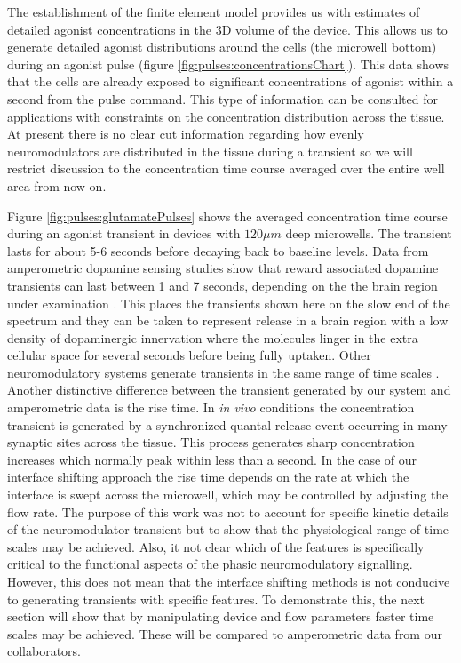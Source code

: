   The establishment of the finite element model provides us with estimates of detailed agonist concentrations in the 3D volume of the device. This allows us to generate detailed agonist distributions around the cells (the microwell bottom) during an agonist pulse (figure \ref{fig:pulses:concentrationsChart}). This data shows that the cells are already exposed to significant concentrations of agonist within a second from the pulse command. This type of information can be consulted for applications with constraints on the concentration distribution across the tissue. At present there is no clear cut information regarding how evenly neuromodulators are distributed in the tissue during a transient so we will restrict discussion to the concentration time course averaged over the entire well area from now on.

  Figure \ref{fig:pulses:glutamatePulses} shows the averaged concentration time course during an agonist transient in devices with \(120 \mu m\) deep microwells. The transient lasts for about 5-6 seconds before decaying back to baseline levels. Data from amperometric dopamine sensing studies show that reward associated dopamine transients can last between 1 and 7 seconds, depending on the the brain region under examination \cite{mittleman2008cerebellar,phillips2003subsecond,venton2003real}. This places the transients shown here on the slow end of the spectrum and they can be taken to represent release in a brain region with a low density of dopaminergic innervation where the molecules linger in the extra cellular space for several seconds before being fully uptaken. Other neuromodulatory systems generate transients in the same range of time scales \cite{dankoski2015monitoring,dugast2002vivo,sarter2009phasic}. Another distinctive difference between the transient generated by our system and amperometric data is the rise time. In \textit{in vivo} conditions the concentration transient is generated by a synchronized quantal release event occurring in many synaptic sites across the tissue. This process generates sharp concentration increases which normally peak within less than a second. In the case of our interface shifting approach the rise time depends on the rate at which the interface is swept across the microwell, which may be controlled by adjusting the flow rate. The purpose of this work was not to account for specific kinetic details of the neuromodulator transient but to show that the physiological range of time scales may be achieved. Also, it not clear which of the features is specifically critical to the functional aspects of the phasic neuromodulatory signalling. However, this does not mean that the interface shifting methods is not conducive to generating transients with specific features. To demonstrate this, the next section will show that by manipulating device and flow parameters faster time scales may be achieved. These will be compared to amperometric data from our collaborators.

